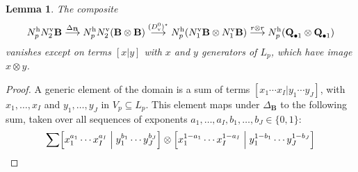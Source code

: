 \documentclass[11pt]{amsart} \renewcommand{\baselinestretch}{1.2}
\theoremstyle{plain}
\newtheorem{lem}[thm]{Lemma}
\theoremstyle{definition}
\renewcommand{\to}{\longrightarrow}
\newcommand{\DeltatubfD}{\Delta_{\mathrm{\textbf{B}}}}
\newcommand{\uver}{^\mathrm{v}}
\newcommand{\uhor}{^\mathrm{h}}
\newcommand{\dver}{_\mathrm{v}}
\begin{document}
\begin{appendices}

\begin{lem}
\label{firstCompositeLemma}
The composite
\[N\uhor_{p}N\uver_2\textup{\textbf{B}}\overset{\DeltatubfD}{\to} N\uhor_{p}N\uver_2(\textup{\textbf{B}}\otimes\textup{\textbf{B}}) \overset{(D\dver^0)^\star}{\to} N\uhor_{p}(N\uver_1\textup{\textbf{B}}\otimes N\uver_1\textup{\textbf{B}})\overset{r\otimes r}{\to}N\uhor_p(\textup{\textbf{Q}}_{\bullet 1}\otimes \textup{\textbf{Q}}_{\bullet 1})\]
vanishes except on terms $[x|y]$ with $x$ and $y$ generators of $ L_p$, which have image $x\otimes y$.
\end{lem}
\begin{proof}
A generic element of the domain is a sum of terms $[x_1\cdots x_I|y_1\cdots y_J]$, with $x_1,\ldots,x_I$ and $y_1,\ldots,y_J$ in $V_p\subseteq L_p$. This element maps under $\DeltatubfD$ to the following sum, taken over all sequences of exponents $a_1,\ldots,a_I,b_1,\ldots,b_J\in\{0,1\}$:
\[\sum%
\textstyle\Bigl[x_1^{a_1}\cdots x_I^{a_I}\Bigm|y_1^{b_1}\cdots y_J^{b_J}\Bigr]\otimes
\Bigl[x_1^{1-a_1}\cdots x_I^{1-a_I}\Bigm|y_1^{1-b_1}\cdots y_J^{1-b_J}\Bigr]
\]
\end{proof}
\end{appendices}
\end{document}
